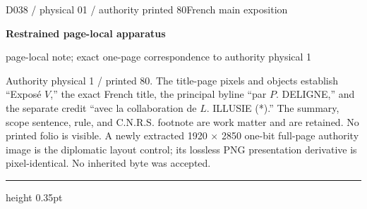 \documentclass[9pt]{article}
\newcommand{\CanonText}[1]{\par{\fontsize{8.0}{9.35}\selectfont\RaggedRight #1\par}\vspace{2.2pt}}
\newcommand{\LayerTitle}{Restrained page-local apparatus}
\begin{document}
\noindent\begin{minipage}[t][\dimexpr\textheight-5pt\relax][t]{\textwidth}
{\sffamily\fontsize{7.3}{8.2}\selectfont\color{Quiet} D038 / physical 01 / authority printed 80\hfill French main exposition}
\par{}\vspace{4.5pt}
{\sffamily\fontsize{10.4}{11.6}\selectfont\bfseries\color{Accent} \LayerTitle}
\par{\sffamily\fontsize{6.7}{7.7}\selectfont\color{Quiet} page-local note; exact one-page correspondence to authority physical 1}
\vspace{5pt}
\CanonText{Authority physical 1 / printed 80. The title-page pixels and objects establish “Exposé \(V\),” the exact French title, the principal byline “par \(P\). DELIGNE,” and the separate credit “avec la collaboration de \(L\). ILLUSIE (*).” The summary, scope sentence, rule, and C.N.R.S. footnote are work matter and are retained. No printed folio is visible. A newly extracted 1920 \(\times{}\) 2850 one-bit full-page authority image is the diplomatic layout control; its lossless PNG presentation derivative is pixel-identical. No inherited byte was accepted.}
\vfill
{\color{Accent}\hrule height 0.35pt}\vspace{3pt}
\end{minipage}
\newpage
\end{document}
